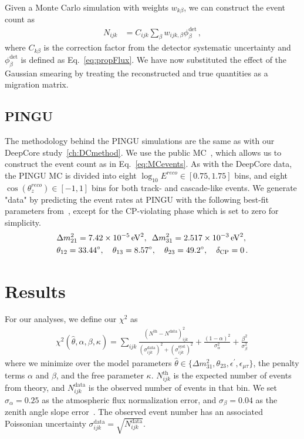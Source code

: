 \documentclass[draft=True]{revtex4-2}
\newcommand{\zreco}{\ensuremath{\cos{(\theta_z^{reco})}}}
\newcommand{\emt}{\ensuremath{\epsilon_{\mu\tau}}}
\newcommand{\ep}{\ensuremath{\epsilon^\prime}}
\begin{document}
Given a Monte Carlo simulation with weights $w_{k\beta}$, we can construct the event count as
\begin{align}\label{eq:MCevents}
    N_{ijk} &= C_{ijk}\sum_{\beta}w_{ijk,\beta} \phi_\beta^\text{det}\,,
\end{align}
where $C_{k\beta}$ is the correction factor from the detector systematic uncertainty and $\phi_\beta^\text{det}$ is defined as Eq.~\ref{eq:propFlux}. We have now substituted the effect of the Gaussian smearing 
by treating the reconstructed and true quantities as a migration matrix. 
\subsection{PINGU}\label{ch:PINGUmethod}
The methodology behind the PINGU simulations are the same as with our DeepCore study~\ref{ch:DCmethod}. We use the public MC~\cite{PINGUdata}, which allows us to construct the event count as in Eq.~\ref{eq:MCevents}.
As with the DeepCore data, the PINGU MC is divided into eight 
$\log_{10}E^{reco} \in [0.75,1.75]$ bins, and eight $\zreco \in [-1,1]$ bins for both track- and cascade-like events. 
We generate "data" by predicting the event rates at PINGU with the following best-fit parameters from~\cite{nufit}, except for the CP-violating phase which is set to zero for simplicity.
\begin{align}\label{eq:PINGUparams}
    &\Delta m^2_{21} =  \SI{7.42e-5}{\electronvolt^2},\hspace{0.5em} \Delta m^2_{31} =  \SI{2.517e-3}{\electronvolt^2}, \nonumber \\
    &\theta_{12} = \SI{33.44}{\degree},\hspace{1em} \theta_{13} = \SI{8.57}{\degree},\hspace{1em} \theta_{23} = \SI{49.2}{\degree}, \hspace{1em} \delta_\text{CP} = 0\,.
\end{align}



\section{Results}
For our analyses, we define our $\chi^2$ as
\begin{align} \label{eq:ICchisq}
    \chi^{2}(\hat{\theta},\alpha,\beta, \kappa)=\sum_{ijk} \frac{\left(N^\text{th}-N^\text{data}\right)_{ijk}^{2}}
    {\left(\sigma^\text{data}_{ijk}\right)^{2} + \left(\sigma^\text{syst}_{ijk}\right)^{2}}+ 
    \frac{(1-\alpha)^2}{\sigma_\alpha^2} + \frac{\beta^2}{\sigma_\beta^2}\,
\end{align}
where we minimize over the model parameters $\hat{\theta} \in \{\Delta m_{31}^2, \theta_{23}, \ep, \emt\}$, the penalty terms $\alpha$ and $\beta$, and the free parameter $\kappa$.
$N_{ijk}^\text{th}$ is the expected number of events from theory, and $N_{ijk}^\text{data}$ is the observed number of events in that bin. We set $\sigma_\alpha = 0.25$ as the atmospheric flux normalization error, and $\sigma_\beta = 0.04$ as the zenith angle slope error~\cite{hondapaper}. 
The observed event number has an associated Poissonian uncertainty $\sigma_{ijk}^\text{data} = \sqrt{N_{ijk}^\text{data}}$.
\end{document}
